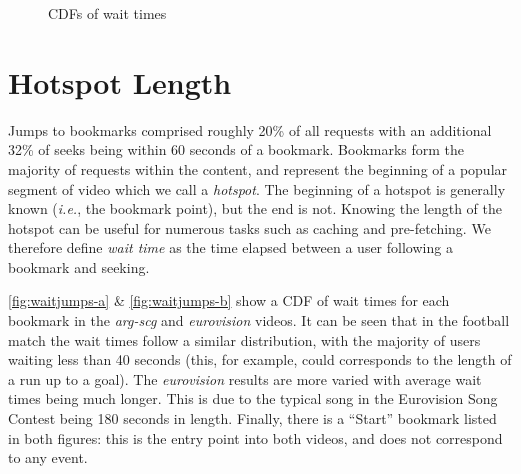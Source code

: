 \begin{figure}[t]
    \centering



    \caption{CDFs of wait times}
    \label{fig:waitjumps}
\end{figure}

\section{Hotspot Length}
\label{sect:hotspot_length}

Jumps to bookmarks comprised roughly 20\% of all requests with an additional 32\% of seeks being within 60 seconds of a bookmark. Bookmarks form the majority of requests within the content, and represent the beginning of a popular segment of video which we call a \emph{hotspot}. The beginning of a hotspot is generally known (\emph{i.e.}, the bookmark point), but the end is not. Knowing the length of the hotspot can be useful for numerous tasks such as caching and pre-fetching. We therefore define \emph{wait time} as the time elapsed between a user following a bookmark and seeking.

\autoref{fig:waitjumps-a} \& \autoref{fig:waitjumps-b} show a CDF of wait times for each bookmark in the \emph{arg-scg} and \emph{eurovision} videos. It can be seen that in the football match the wait times follow a similar distribution, with the majority of users waiting less than 40 seconds (this, for example, could corresponds to the length of a run up to a goal). The \emph{eurovision} results are more varied with average wait times being much longer. This is due to the typical song in the Eurovision Song Contest being 180 seconds in length.  Finally, there is a ``Start'' bookmark listed in both figures: this is the entry point into both videos, and does not correspond to any event.

